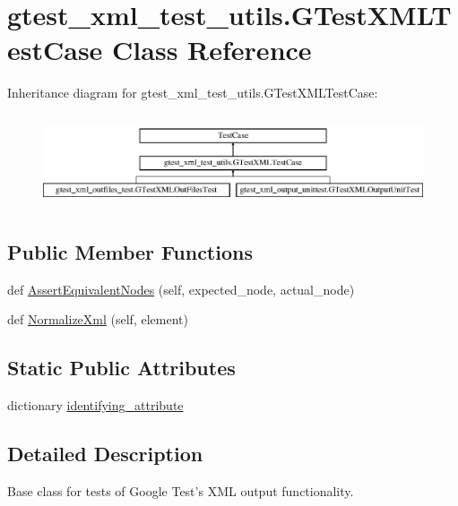 \hypertarget{classgtest__xml__test__utils_1_1_g_test_x_m_l_test_case}{}\section{gtest\+\_\+xml\+\_\+test\+\_\+utils.\+G\+Test\+X\+M\+L\+Test\+Case Class Reference}
\label{classgtest__xml__test__utils_1_1_g_test_x_m_l_test_case}
Inheritance diagram for gtest\+\_\+xml\+\_\+test\+\_\+utils.\+G\+Test\+X\+M\+L\+Test\+Case\+:\begin{figure}[H]
\begin{center}
\leavevmode
\includegraphics[height=2.781457cm]{classgtest__xml__test__utils_1_1_g_test_x_m_l_test_case}
\end{center}
\end{figure}
\subsection*{Public Member Functions}
\begin{DoxyCompactItemize}
\item 
def \hyperlink{classgtest__xml__test__utils_1_1_g_test_x_m_l_test_case_a977273e8863f4f41d121bb5a64b08d32}{Assert\+Equivalent\+Nodes} (self, expected\+\_\+node, actual\+\_\+node)
\item 
def \hyperlink{classgtest__xml__test__utils_1_1_g_test_x_m_l_test_case_ac4823e96c3b5327b25a340a3605447d9}{Normalize\+Xml} (self, element)
\end{DoxyCompactItemize}
\subsection*{Static Public Attributes}
\begin{DoxyCompactItemize}
\item 
dictionary \hyperlink{classgtest__xml__test__utils_1_1_g_test_x_m_l_test_case_a0e3a4e84e18f29d2248dcd670a0a6ae6}{identifying\+\_\+attribute}
\end{DoxyCompactItemize}


\subsection{Detailed Description}
\begin{DoxyVerb}Base class for tests of Google Test's XML output functionality.
\end{DoxyVerb}
 

